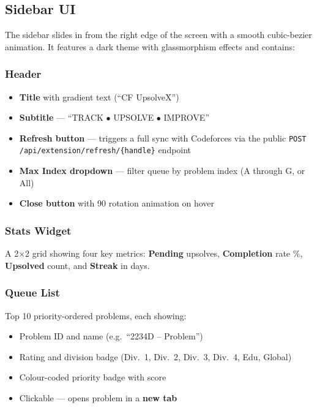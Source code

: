\documentclass[11pt, a4paper]{article}
\begin{document}
\subsection{Sidebar UI}

The sidebar slides in from the right edge of the screen with a smooth
cubic-bezier animation. It features a dark theme with glassmorphism
effects and contains:

\subsubsection{Header}

\begin{itemize}
  \item \textbf{Title} with gradient text (``CF UpsolveX'')
  \item \textbf{Subtitle} --- ``TRACK $\bullet$ UPSOLVE $\bullet$ IMPROVE''
  \item \textbf{Refresh button} --- triggers a full sync with Codeforces via
        the public \texttt{POST /api/extension/refresh/\{handle\}} endpoint
  \item \textbf{Max Index dropdown} --- filter queue by problem index (A through G, or All)
  \item \textbf{Close button} with 90\textdegree{} rotation animation on hover
\end{itemize}

\subsubsection{Stats Widget}

A 2$\times$2 grid showing four key metrics:
\textbf{Pending} upsolves,
\textbf{Completion} rate \%,
\textbf{Upsolved} count, and
\textbf{Streak} in days.

\subsubsection{Queue List}

Top 10 priority-ordered problems, each showing:
\begin{itemize}
  \item Problem ID and name (e.g.\ ``2234D -- Problem'')
  \item Rating and division badge (Div.~1, Div.~2, Div.~3, Div.~4, Edu, Global)
  \item Colour-coded priority badge with score
  \item Clickable --- opens problem in a \textbf{new tab}
\end{itemize}
\end{document}
